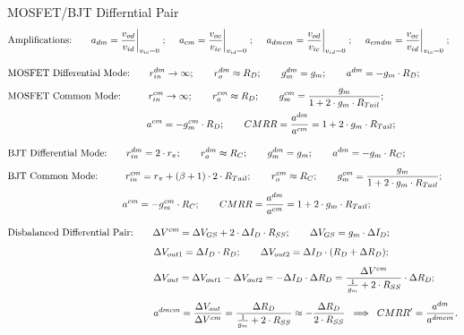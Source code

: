 \documentclass[11pt]{article}
\begin{document}
\begin{sectionbox}{MOSFET/BJT Differntial Pair}
\begin{align*}
& \text{Amplifications:} \qquad
  a_{dm} = \frac{v_{od}}{v_{id}} \bigg|_{v_{ic} = 0} \;; \; \quad
  a_{cm} = \frac{v_{oc}}{v_{ic}} \bigg|_{v_{id} = 0} \;; \; \quad
  a_{dmcm} = \frac{v_{od}}{v_{ic}} \bigg|_{v_{id} = 0} \;; \; \quad
  a_{cmdm} = \frac{v_{oc}}{v_{id}} \bigg|_{v_{ic} = 0} \;; \\[1em]
& \text{MOSFET Differential Mode:} \qquad
  r_{in}^{dm} \rightarrow \infty; \qquad
  r_o^{dm} \approx R_D; \qquad
  g_m^{dm} = g_m; \qquad
  a^{dm} = - g_m \cdot R_D; \\[0.5em]
& \text{MOSFET Common Mode:} \qquad \; \; \;
  r_{in}^{cm} \rightarrow \infty; \qquad
  r_o^{cm} \approx R_D; \qquad
  g_m^{cm} = \frac{g_m}{1 + 2 \cdot g_m \cdot R_{Tail}};  \\[0.1em]
& \hspace*{14.3em} a^{cm} = - g_m^{cm} \cdot R_D; \qquad
  CMRR = \frac{a^{dm}}{a^{cm}} = 1 + 2 \cdot g_m \cdot R_{Tail}; \\[1em]
& \text{BJT Differential Mode:} \qquad
  r_{in}^{dm} = 2 \cdot r_{\pi}; \qquad
  r_o^{dm} \approx R_C; \qquad
  g_m^{dm} = g_m; \qquad
  a^{dm} = - g_m \cdot R_C; \\[0.5em]
& \text{BJT Common Mode:} \qquad \; \; \;
  r_{in}^{cm} = r_{\pi} + (\beta + 1) \cdot 2 \cdot R_{Tail}; \qquad
  r_o^{cm} \approx R_C; \qquad
  g_m^{cm} = \frac{g_m}{1 + 2 \cdot g_m \cdot R_{Tail}}; \\[0.1em]
& \hspace*{11.8em} a^{cm} = - g_m^{cm} \cdot R_C; \qquad
  CMRR = \frac{a^{dm}}{a^{cm}} = 1 + 2 \cdot g_m \cdot R_{Tail}; \\[1em]
& \text{Disbalanced Differential Pair:} \qquad \Delta V^{cm} = \Delta V_{GS} + 2 \cdot \Delta I_D \cdot R_{SS}; \qquad \Delta V_{GS} = g_m \cdot \Delta I_D; \\[0.5em]
& \hspace*{15em} \Delta V_{out1} = \Delta I_D \cdot R_D; \qquad \Delta V_{out2} = \Delta I_D \cdot (R_D + \Delta R_D); \\[0.5em]
& \hspace*{15em} \Delta V_{out} = \Delta V_{out1} - \Delta V_{out2} = - \Delta I_D \cdot \Delta R_D = \frac{\Delta V^{cm}}{\frac{1}{g_m} + 2 \cdot R_{SS}} \cdot \Delta R_D; \\[0.5em]
& \hspace*{15em} a^{dmcm} = \frac{\Delta V_{out}}{\Delta V^{cm}} = \frac{\Delta R_D}{\frac{1}{g_m} + 2 \cdot R_{SS}} \approx - \frac{\Delta R_D}{2 \cdot R_{SS}} \; \implies \; CMRR^{\prime} = \frac{a^{dm}}{a^{dmcm}}.
\end{align*}
\end{sectionbox}
\end{document}
